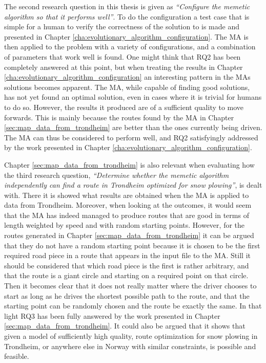 The second research question in this thesis is given as \emph{\enquote{Configure the memetic algorithm so that it performs well}}. To do the configuration a test case that is simple for a human to verify the correctness of the solution to is made and presented in Chapter \ref{cha:evolutionary_algorithm_configuration}. The MA is then applied to the problem with a variety of configurations, and a combination of parameters that work well is found. One might think that RQ2 has been completely answered at this point, but when treating the results in Chapter \ref{cha:evolutionary_algorithm_configuration} an interesting pattern in the MAs solutions becomes apparent. The MA, while capable of finding good solutions, has not yet found an optimal solution, even in cases where it is trivial for humans to do so. However, the results it produced are of a sufficient quality to move forwards. This is mainly because the routes found by the MA in Chapter \ref{sec:map_data_from_trondheim} are better than the ones currently being driven. The MA can thus be considered to perform well, and RQ2 satisfyingly addressed by the work presented in Chapter \ref{cha:evolutionary_algorithm_configuration}.

Chapter \ref{sec:map_data_from_trondheim} is also relevant when evaluating how the third research question, \emph{\enquote{Determine whether the memetic algorithm independently can find a route in Trondheim optimized for snow plowing}}, is dealt with. There it is showed what results are obtained when the MA is applied to data from Trondheim. Moreover, when looking at the outcomes, it would seem that the MA has indeed managed to produce routes that are good in terms of length weighted by speed and with random starting points. However, for the routes generated in Chapter \ref{sec:map_data_from_trondheim} it can be argued that they do not have a random starting point because it is chosen to be the first required road piece in a route that appears in the input file to the MA. Still it should be considered that which road piece is the first is rather arbitrary, and that the route is a giant circle and starting on a required point on that circle. Then it becomes clear that it does not really matter where the driver chooses to start as long as he drives the shortest possible path to the route, and that the starting point can be randomly chosen and the route be exactly the same. In that light RQ3 has been fully answered by the work presented in Chapter \ref{sec:map_data_from_trondheim}. It could also be argued that it shows that given a model of sufficiently high quality, route optimization for snow plowing in Trondheim, or anywhere else in Norway with similar constraints, is possible and feasible.

